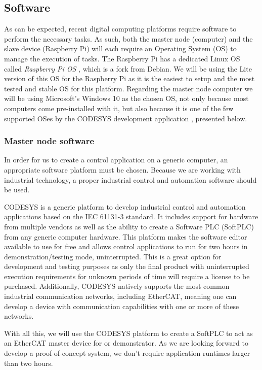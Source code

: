 \subsection{Software} \label{sec:proposed-software}

As can be expected, recent digital computing platforms require software to perform the necessary tasks.
As such, both the master node (computer) and the slave device (Raspberry Pi) will each require an Operating System (OS) to manage the execution of tasks.
The Raspberry Pi has a dedicated Linux OS called \emph{Raspberry Pi OS} \cite{os:raspberry-pi-os}, which is a fork from Debian.
We will be using the Lite version of this OS for the Raspberry Pi as it is the easiest to setup and the most tested and stable OS for this platform.
Regarding the master node computer we will be using Microsoft's Windows 10 as the chosen OS, not only because most computers come pre-installed with it, but also because it is one of the few supported OSes by the CODESYS development application \cite{ide:codesys}, presented below.

\subsubsection{Master node software}

In order for us to create a control application on a generic computer, an appropriate software platform must be chosen.
Because we are working with industrial technology, a proper industrial control and automation software should be used.

CODESYS is a generic platform to develop industrial control and automation applications based on the IEC 61131-3 standard.
It includes support for hardware from multiple vendors as well as the ability to create a Software PLC (SoftPLC) from any generic computer hardware.
This platform makes the software editor available to use for free and allows control applications to run for two hours in demonstration/testing mode, uninterrupted.
This is a great option for development and testing purposes as only the final product with uninterrupted execution requirements for unknown periods of time will require a license to be purchased.
Additionally, CODESYS natively supports the most common industrial communication networks, including EtherCAT, meaning one can develop a device with communication capabilities with one or more of these networks.

With all this, we will use the CODESYS platform to create a SoftPLC to act as an EtherCAT master device for or demonstrator.
As we are looking forward to develop a proof-of-concept system, we don't require application runtimes larger than two hours.

